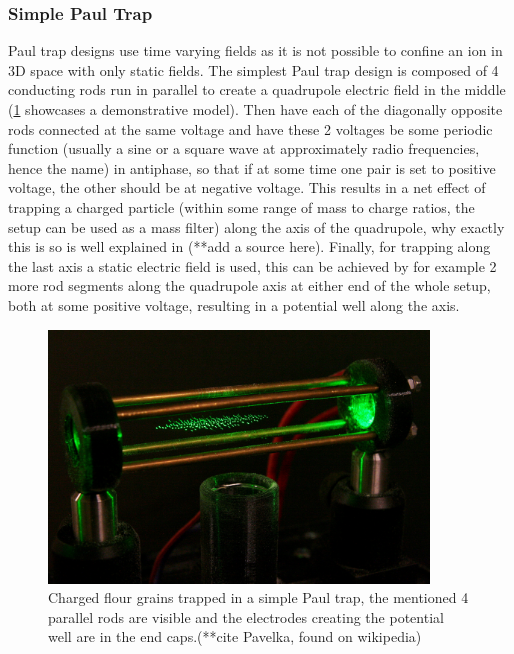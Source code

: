 \subsubsection{Simple Paul Trap}
Paul trap designs use time varying fields as it is not possible to confine an ion in 3D space with only static fields.
The simplest Paul trap design is composed of 4 conducting rods run in parallel to create a quadrupole electric field in the middle (\cref{fig:ITQC_RFQ_Flour} showcases a demonstrative model).
Then have each of the diagonally opposite rods connected at the same voltage and have these 2 voltages be some periodic function (usually a sine or a square wave at approximately radio frequencies, hence the name) in antiphase, so that if at some time one pair is set to positive voltage, the other should be at negative voltage.
This results in a net effect of trapping a charged particle (within some range of mass to charge ratios, the setup can be used as a mass filter) along the axis of the quadrupole, why exactly this is so is well explained in (**add a source here).
Finally, for trapping along the last axis a static electric field is used, this can be achieved by for example 2 more rod segments along the quadrupole axis at either end of the whole setup, both at some positive voltage, resulting in a potential well along the axis.

\begin{figure}[H]
    \centering
    \includegraphics[width=0.9\textwidth]{images/ITQC_RFQ_Flour.jpg}
    \caption{Charged flour grains trapped in a simple Paul trap, the mentioned 4 parallel rods are visible and the electrodes creating the potential well are in the end caps.(**cite Pavelka, found on wikipedia)}\label{fig:ITQC_RFQ_Flour}
\end{figure}

